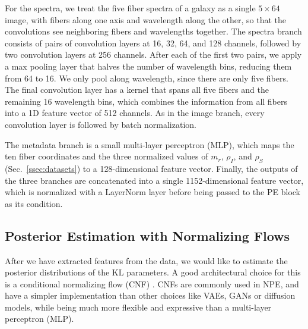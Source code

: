 For the spectra, we treat the five fiber spectra of a galaxy as a single $5\times64$ image, with fibers along one axis and wavelength along the other, so that the convolutions see neighboring fibers and wavelengths together. The spectra branch consists of pairs of convolution layers at 16, 32, 64, and 128 channels, followed by two convolution layers at 256 channels. After each of the first two pairs, we apply a max pooling layer that halves the number of wavelength bins, reducing them from 64 to 16. We only pool along wavelength, since there are only five fibers. The final convolution layer has a kernel that spans all five fibers and the remaining 16 wavelength bins, which combines the information from all fibers into a 1D feature vector of 512 channels. As in the image branch, every convolution layer is followed by batch normalization.

The metadata branch is a small multi-layer perceptron (MLP), which maps the ten fiber coordinates and the three normalized values of $m_r$, $\rho_I$, and $\rho_S$ (Sec.~\ref{ssec:datasets}) to a 128-dimensional feature vector. Finally, the outputs of the three branches are concatenated into a single 1152-dimensional feature vector, which is normalized with a LayerNorm layer before being passed to the PE block as its condition.

\subsection{Posterior Estimation with Normalizing Flows}
\label{ssec:npe}
After we have extracted features from the data, we would like to estimate the posterior distributions of the KL parameters. A good architectural choice for this is a conditional normalizing flow (CNF) \citep{NormalizingFlows, CNF}. CNFs are commonly used in NPE, and have a simpler implementation than other choices like VAEs, GANs or diffusion models, while being much more flexible and expressive than a multi-layer perceptron (MLP).

